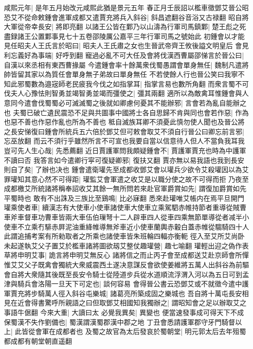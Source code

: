 咸熙元年|{
	是年五月始改元咸熙此猶是景元五年}
春正月壬辰詔以檻車徵鄧艾晉公昭恐艾不從命敕鍾會進軍成都又遣賈充將兵入斜谷|{
	斜昌遮翻谷音浴又古禄翻}
昭自將大軍從帝幸長安|{
	將即亮翻}
以諸王公皆在鄴乃以山濤為行軍司馬鎮鄴|{
	楚王彪之死盡録諸王公置鄴事見七十五卷邵陵厲公嘉平三年行軍司馬之號始此}
初鍾會以才能見任昭夫人王氏言於昭曰|{
	昭夫人王氏肅之女也生晉武帝齊王攸後謚文明皇后}
會見利忘義好為事端|{
	好呼到翻}
寵過必亂不可大任及會將伐漢西曹屬邵悌言於晉公曰|{
	自漢以來丞相有東西曹掾屬}
今遣鍾會率十餘萬衆伐蜀愚謂會單身無任|{
	魏制凡遣將帥皆留其家以為質任會單身無子弟故曰單身無任}
不若使餘人行也晉公笑曰我寧不知此邪蜀數為邉宼師老民疲我今伐之如指掌耳|{
	指掌言易也數所角翻}
而衆言蜀不可伐夫人心豫怯則智勇並竭智勇並竭而彊使之|{
	彊其兩翻}
適所以為敵禽耳惟鍾會與人意同今遣會伐蜀蜀必可滅滅蜀之後就如卿慮何憂其不能辦邪|{
	言會若為亂自能辦之也}
夫蜀已破亡遺民震恐不足與共圖事中國將士各自思歸不肯與同也會若作惡|{
	作為也惡不善也作惡作亂也所為不善也}
秪自滅族耳卿不須憂此慎勿使人聞也及晉公將之長安悌復曰鍾會所統兵五六倍於鄧艾但可敕會取艾不須自行晉公曰卿忘前言邪|{
	忘巫放翻}
而云不須行乎雖然所言不可宣也我要自當以信意待人但人不當負我耳我豈可先人生心哉|{
	先悉薦翻}
近日賈護軍問我頗疑鍾會不|{
	賈護軍賈充也時為中護軍不讀曰否}
我答言如今遣卿行寜可復疑卿邪|{
	復扶又翻}
賈亦無以易我語也我到長安則自了矣|{
	了辦也决也}
鍾會遣衛瓘先至成都收鄧艾會以瓘兵少欲令艾殺瓘因以為艾罪瓘知其意心然不可得距|{
	瓘監艾會軍遣之收艾是以職分使之故不可得而拒}
乃夜至成都檄艾所統諸將稱奉詔收艾其餘一無所問若來赴官軍爵賞如先|{
	謂復加爵賞如先平蜀時也}
敢有不出誅及三族比至鷄鳴|{
	比必寐翻}
悉來赴瓘唯艾帳内在焉平旦開門瓘乘使者車|{
	續漢志有大使車小使車諸使車大使車立乘駕駟赤帷持節者重導從賊曹車斧車督車功曹車皆兩大車伍伯璅弩十二人辟車四人從車四乘無節單導從者减半小使車不立乘冇騑赤屛泥油重絳帷導無斧車近小使車蘭輿赤轂白蓋赤帷從騶騎四十人此謂追捕考案有所勑取者之所乘也諸使車皆朱班輪四輻亦衡軛}
徑入至艾所艾尚卧未起遂執艾父子置艾於檻車諸將圖欲刼艾整仗趣瓘營|{
	趣七喻翻}
瓘輕出迎之偽作表草將申明艾事|{
	詭言將申明艾無反心}
諸將信之而止丙子會至成都送艾赴京師會所憚惟艾艾父子既禽會獨統大衆威震西土遂决意謀反會欲使姜維將五萬人出斜谷為前驅會自將大衆隨其後既至長安令騎士從陸道步兵從水道順流浮渭入河以為五日可到孟津與騎兵會洛陽一旦天下可定也|{
	談何容易}
會得晉公書云恐鄧艾或不就徵今遣中護軍賈充將步騎萬人徑入斜谷屯樂城|{
	諸葛亮所築成固之樂城也}
吾自將十萬屯長安相見在近會得書驚呼所親語之曰但取鄧艾相國知我獨辦之|{
	謂昭知會之足以辦取艾之事語牛倨翻}
今來大重|{
	大讀曰太}
必覺我異矣|{
	異變也}
便當速發事成可得天下不成保蜀漢不失作劉備也|{
	蜀漢謂漢蜀郡漢中郡之地}
丁丑會悉請護軍郡守牙門騎督以上|{
	此皆從會軍在成都者也}
及蜀之故官為太后發哀於蜀朝堂|{
	明元郭太后去年殂蜀都成都有朝堂朝直遥翻}
